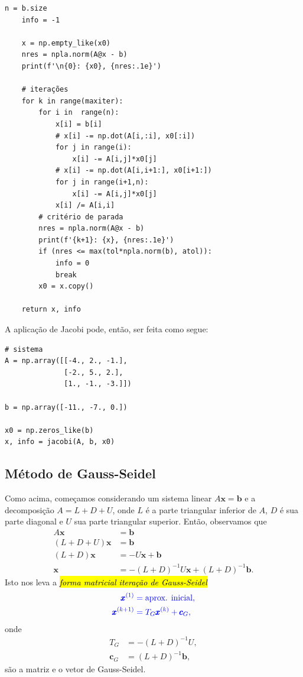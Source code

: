 \begin{ex}
\begin{lstlisting}[caption=jacobi.py, label=cap_sislin_sec_jgs:cod:jacobi]
    n = b.size
    info = -1

    x = np.empty_like(x0)
    nres = npla.norm(A@x - b)
    print(f'\n{0}: {x0}, {nres:.1e}')
    
    # iterações
    for k in range(maxiter):
        for i in  range(n):
            x[i] = b[i]
            # x[i] -= np.dot(A[i,:i], x0[:i])
            for j in range(i):
                x[i] -= A[i,j]*x0[j]
            # x[i] -= np.dot(A[i,i+1:], x0[i+1:])
            for j in range(i+1,n):
                x[i] -= A[i,j]*x0[j]
            x[i] /= A[i,i]
        # critério de parada
        nres = npla.norm(A@x - b)
        print(f'{k+1}: {x}, {nres:.1e}')
        if (nres <= max(tol*npla.norm(b), atol)):
            info = 0
            break
        x0 = x.copy()

    return x, info
\end{lstlisting}
A aplicação de Jacobi pode, então, ser feita como segue:
\begin{lstlisting}
# sistema
A = np.array([[-4., 2., -1.],
              [-2., 5., 2.],
              [1., -1., -3.]])

b = np.array([-11., -7., 0.])

x0 = np.zeros_like(b)
x, info = jacobi(A, b, x0)
\end{lstlisting}
\end{ex}

\subsection{Método de Gauss-Seidel}

Como acima, começamos considerando um sistema linear $A\pmb{x} = \pmb{b}$ e a decomposição $A = L + D + U$, onde $L$ é a parte triangular inferior de $A$, $D$ é sua parte diagonal e $U$ sua parte triangular superior. Então, observamos que
\begin{align}
  A\pmb{x} &= \pmb{b}\\
  (L + D + U)\pmb{x} &= \pmb{b}\\
  (L+D)\pmb{x} &= -U\pmb{x} + \pmb{b}\\
  \pmb{x} &= -(L+D)^{-1}U\pmb{x} + (L+D)^{-1}\pmb{b}.
\end{align}
Isto nos leva a \hl{\emph{forma matricial iteração de Gauss-Seidel}}
\begin{equation}\label{cap_sislin_sec_jgs:eq:iter_gs_mat}\color{blue}\begin{aligned}
    \pmb{x}^{(1)} &= \text{aprox. inicial},\\
    \pmb{x}^{(k+1)} &= T_G\pmb{x}^{(k)} + \pmb{c}_G,
  \end{aligned}
\end{equation}
onde
\begin{align}
  T_G &= -(L+D)^{-1}U,\\
  \pmb{c}_G &= (L+D)^{-1}\pmb{b},
\end{align}
são a matriz e o vetor de Gauss-Seidel.


